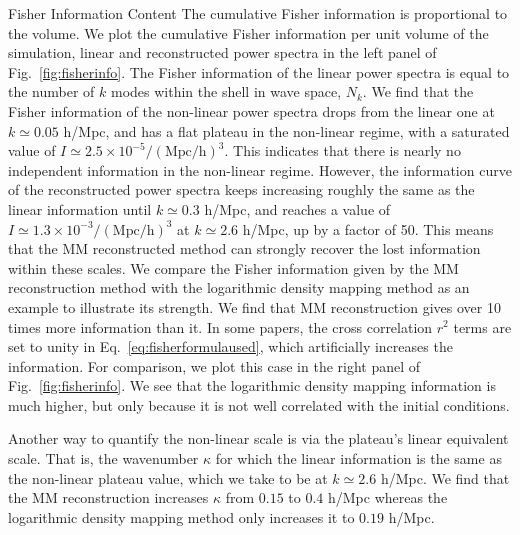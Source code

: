 \begin{section}{Fisher Information Content}
  The cumulative Fisher information is proportional to the volume. 
  We plot the cumulative Fisher information per unit volume of the
  simulation, linear and reconstructed power spectra in the left panel of 
  Fig.~\ref{fig:fisherinfo}. The Fisher information of the linear 
  power spectra is equal to the number of $k$ modes within the shell in 
  wave space, $N_k$. We find that the Fisher information of the
  non-linear power spectra drops from the linear one at
  $k \simeq 0.05$ h/Mpc, and has a flat plateau in the non-linear
  regime, with a saturated value of
  $I \simeq 2.5 \times 10^{-5}/\mathrm{(Mpc/h)}^3$.  This indicates
  that there is nearly no independent information in the non-linear
  regime.  However, the information curve of the reconstructed power
  spectra keeps increasing roughly the same as the linear information
  until $k\simeq 0.3$ h/Mpc, and reaches a value of 
  $I \simeq 1.3 \times 10^{-3}/\mathrm{(Mpc/h)}^3$ at $k \simeq 2.6$ h/Mpc, up by a
  factor of 50.  
  This means that the MM reconstructed method can
  strongly recover the lost information within these scales.  
  We compare the Fisher information given by the MM reconstruction method
  with the logarithmic density mapping method \cite{bib:Mark2009} as
  an example to illustrate its strength. We find that MM
  reconstruction gives over 10 times more information than it.  In some papers, the cross correlation $r^2$ terms are set
  to unity in Eq.~\ref{eq:fisherformulaused}, which artificially
  increases the information.  For comparison, we plot this case in the right panel of 
  Fig.~\ref{fig:fisherinfo}.  We see that the logarithmic density
  mapping information is much higher, but only because it is not well
  correlated with the initial conditions.

  Another way to quantify the non-linear scale is via the plateau's linear equivalent scale.  That is, the wavenumber $\kappa$ for which the linear information is the same as the non-linear plateau value, which we take to be at $k \simeq 2.6$ h/Mpc.  We find that the MM reconstruction increases $\kappa$ from $0.15$ to $0.4$ h/Mpc whereas the logarithmic density mapping method only increases it to $0.19$ h/Mpc.



\end{section}
